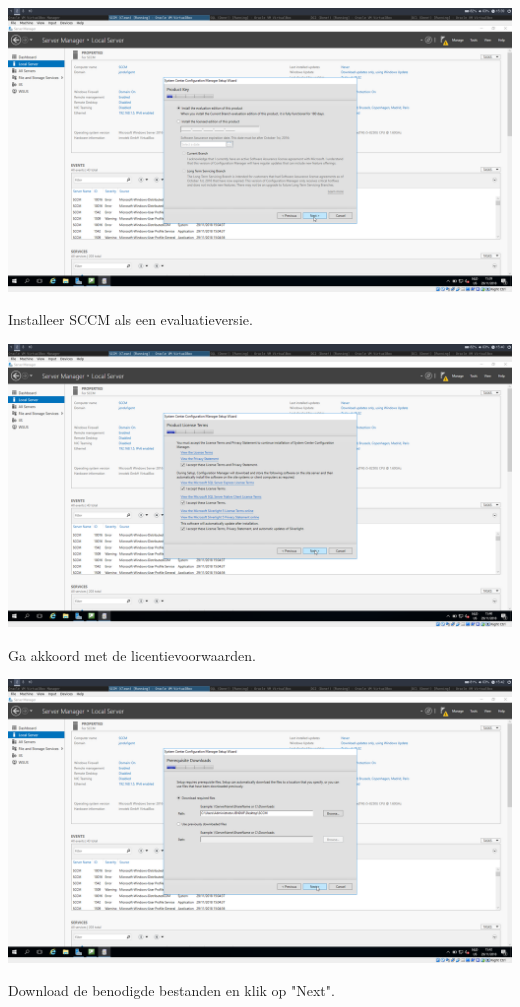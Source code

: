 \documentclass[a4paper]{article}
\begin{document}
\begin{center}
\includegraphics[width=15cm]{Pictures/SCCM/6/1543502394.png}

Installeer SCCM als een evaluatieversie.
\end{center}
\begin{center}
\includegraphics[width=15cm]{Pictures/SCCM/6/1543502403.png}

Ga akkoord met de licentievoorwaarden.
\end{center}
\begin{center}
\includegraphics[width=15cm]{Pictures/SCCM/6/1543502522.png}

Download de benodigde bestanden en klik op "Next".
\end{center}
\end{document}
